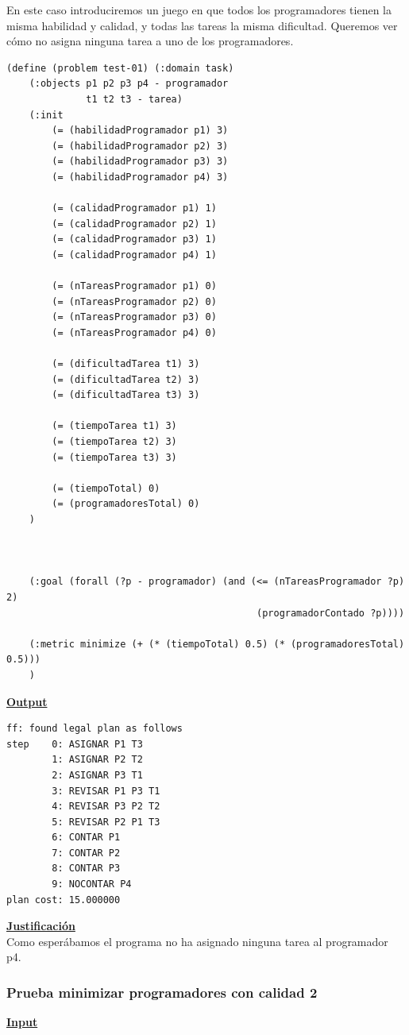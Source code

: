 \documentclass[11pt]{article}
\begin{document}
En este caso introduciremos un juego en que todos los programadores tienen la misma habilidad y calidad, y todas las tareas la misma dificultad. Queremos ver cómo no asigna ninguna tarea a uno de los programadores.
\begin{verbatim}
(define (problem test-01) (:domain task)
    (:objects p1 p2 p3 p4 - programador
			  t1 t2 t3 - tarea)
    (:init
        (= (habilidadProgramador p1) 3)
        (= (habilidadProgramador p2) 3)
        (= (habilidadProgramador p3) 3)
        (= (habilidadProgramador p4) 3)
        
        (= (calidadProgramador p1) 1)
        (= (calidadProgramador p2) 1)
        (= (calidadProgramador p3) 1)
        (= (calidadProgramador p4) 1)
        
        (= (nTareasProgramador p1) 0)
        (= (nTareasProgramador p2) 0)
        (= (nTareasProgramador p3) 0)
        (= (nTareasProgramador p4) 0)
        
        (= (dificultadTarea t1) 3)
        (= (dificultadTarea t2) 3)
        (= (dificultadTarea t3) 3)
        
        (= (tiempoTarea t1) 3)
        (= (tiempoTarea t2) 3)
        (= (tiempoTarea t3) 3)
        
        (= (tiempoTotal) 0)
        (= (programadoresTotal) 0)
    )

    

    (:goal (forall (?p - programador) (and (<= (nTareasProgramador ?p) 2)
											(programadorContado ?p))))
    
    (:metric minimize (+ (* (tiempoTotal) 0.5) (* (programadoresTotal) 0.5)))
    )
 \end{verbatim}
 \medskip
 
 \noindent \underline{\textbf{Output}}
\medskip
\begin{verbatim}
ff: found legal plan as follows
step    0: ASIGNAR P1 T3
        1: ASIGNAR P2 T2
        2: ASIGNAR P3 T1
        3: REVISAR P1 P3 T1
        4: REVISAR P3 P2 T2
        5: REVISAR P2 P1 T3
        6: CONTAR P1
        7: CONTAR P2
        8: CONTAR P3
        9: NOCONTAR P4
plan cost: 15.000000
\end{verbatim}
\medskip

\noindent \underline{\textbf{Justificación}}\\

Como esperábamos el programa no ha asignado ninguna tarea al programador p4.

\subsubsection{Prueba minimizar programadores con calidad 2}
\noindent \underline{\textbf{Input}} \\
\end{document}
